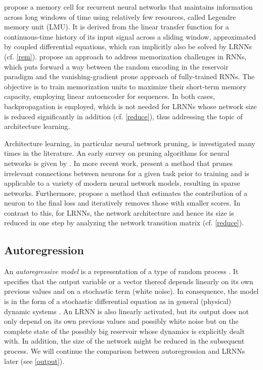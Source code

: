 \documentclass[twoside,11pt]{article}
\theoremstyle{definition}
\begin{document}
\citet{VKE19} propose a memory cell for recurrent neural networks that maintains
information across long windows of time using relatively few resources, called
Legendre memory unit (LMU). It is derived from the linear transfer function for
a continuous-time history of its input signal across a sliding window,
approximated by coupled differential equations, which can implicitly also be
solved by LRNNs (cf. \cref{rem}).
\citet{CSB21} propose an approach to address memorization challenges in RNNs,
which puts forward a way between the random encoding in the reservoir paradigm
and the vanishing-gradient prone approach of fully-trained RNNs. The objective
is to train memorization units to maximize their short-term memory capacity,
employing linear autoencoder for sequences. In both cases, backpropagation is
employed, which is not needed for LRNNs whose network size is reduced
significantly in addition (cf. \cref{reduce}), thus addressing the topic of
architecture learning.

Architecture learning, in particular neural network pruning, is
investigated many times in the literature. An early survey on pruning algorithms
for neural networks is given by \citet{Ree93}. In more recent work,
\citet{LAT19} present a method that prunes irrelevant connections between
neurons for a given task prior to training and is applicable to a variety of
modern neural network models, resulting in sparse networks. Furthermore,
\citet{MM+19} propose a method that estimates the contribution of a neuron to
the final loss and iteratively removes those with smaller scores. In contrast to
this, for LRNNs, the network architecture and hence its size is reduced in one
step by analyzing the network transition matrix (cf. \cref{reduce}).

\subsection{Autoregression}\label{regress}

An \emph{autoregressive model} is a representation of a type of random process
\citep{Aka69}. It specifies that the output variable or a vector thereof depends
linearly on its own previous values and on a stochastic term (white noise). In
consequence, the model is in the form of a stochastic differential equation as in
general (physical) dynamic systems \citep{CK14}. An LRNN is also linearly
activated, but its output does not only depend on its own previous values and
possibly white noise but on the complete state of the possibly big reservoir
whose dynamics is explicitly dealt with. In addition, the size of the network
might be reduced in the subsequent process. We will continue the comparison
between autoregression and LRNNs later (see \cref{output}).
\end{document}
